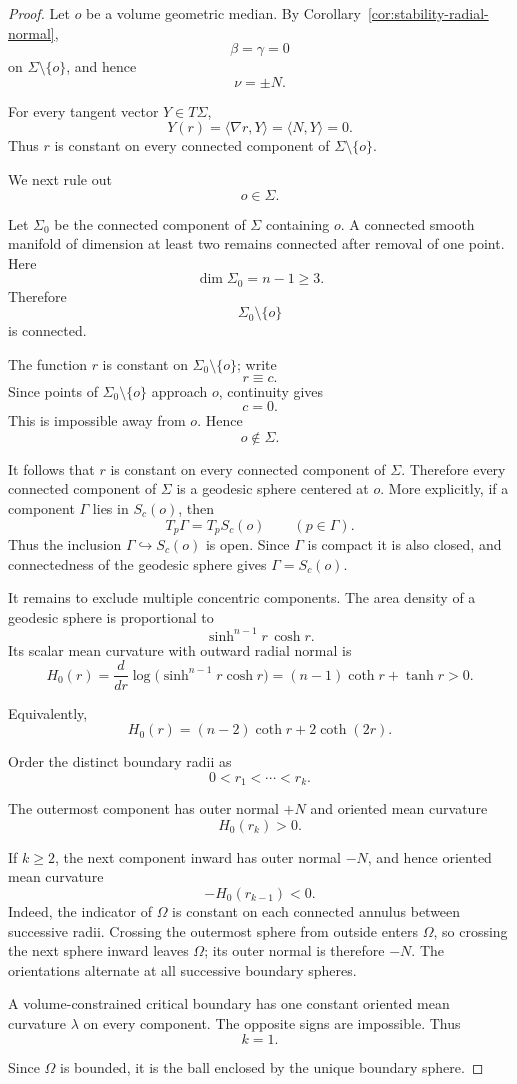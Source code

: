 \documentclass[11pt,reqno]{amsart}
\numberwithin{equation}{section}
\theoremstyle{definition}
\theoremstyle{remark}
\begin{document}
\begin{proof}
Let \(o\) be a volume geometric median. By
Corollary~\ref{cor:stability-radial-normal},
\[
\beta=\gamma=0
\]
on \(\Sigma\setminus\{o\}\), and hence
\[
\nu=\pm N.
\]

For every tangent vector \(Y\in T\Sigma\),
\[
Y(r)
=
\langle\nabla r,Y\rangle
=
\langle N,Y\rangle
=
0.
\]
Thus \(r\) is constant on every connected component of
\(\Sigma\setminus\{o\}\).

We next rule out
\[
o\in\Sigma.
\]

Let \(\Sigma_0\) be the connected component of \(\Sigma\) containing \(o\).
A connected smooth manifold of dimension at least two remains connected
after removal of one point. Here
\[
\dim\Sigma_0=n-1\ge3.
\]
Therefore
\[
\Sigma_0\setminus\{o\}
\]
is connected.

The function \(r\) is constant on
\(\Sigma_0\setminus\{o\}\); write
\[
r\equiv c.
\]
Since points of \(\Sigma_0\setminus\{o\}\) approach \(o\), continuity gives
\[
c=0.
\]
This is impossible away from \(o\). Hence
\[
o\notin\Sigma.
\]

It follows that \(r\) is constant on every connected component of
\(\Sigma\). Therefore every connected component of \(\Sigma\) is a geodesic
sphere centered at \(o\).  More explicitly, if a component \(\Gamma\) lies
in \(S_c(o)\), then
\[
T_p\Gamma=T_pS_c(o)
\qquad(p\in\Gamma).
\]
Thus the inclusion \(\Gamma\hookrightarrow S_c(o)\) is open.  Since
\(\Gamma\) is compact it is also closed, and connectedness of the geodesic
sphere gives \(\Gamma=S_c(o)\).

It remains to exclude multiple concentric components. The area density of a
geodesic sphere is proportional to
\[
\sinh^{n-1}r\,\cosh r.
\]
Its scalar mean curvature with outward radial normal is
\[
H_0(r)
=
\frac{d}{dr}
\log\bigl(\sinh^{n-1}r\cosh r\bigr)
=
(n-1)\coth r+\tanh r
>0.
\]

Equivalently,
\[
H_0(r)
=
(n-2)\coth r+2\coth(2r).
\]

Order the distinct boundary radii as
\[
0<r_1<\cdots<r_k.
\]

The outermost component has outer normal \(+N\) and oriented mean curvature
\[
H_0(r_k)>0.
\]

If \(k\ge2\), the next component inward has outer normal \(-N\), and hence
oriented mean curvature
\[
-H_0(r_{k-1})<0.
\]
Indeed, the indicator of \(\Omega\) is constant on each connected annulus
between successive radii.  Crossing the outermost sphere from outside enters
\(\Omega\), so crossing the next sphere inward leaves \(\Omega\); its outer
normal is therefore \(-N\).  The orientations alternate at all successive
boundary spheres.

A volume-constrained critical boundary has one constant oriented mean
curvature \(\lambda\) on every component. The opposite signs are impossible.
Thus
\[
k=1.
\]

Since \(\Omega\) is bounded, it is the ball enclosed by the unique boundary
sphere.
\end{proof}
\end{document}
